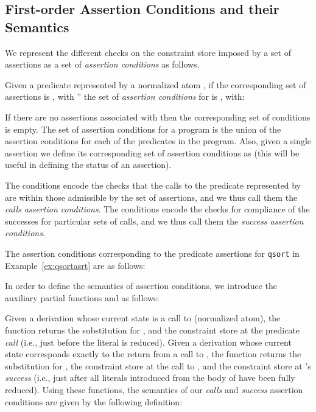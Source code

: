 \documentclass{llncs}
\begin{document}
\subsection{First-order Assertion Conditions and their Semantics}

We represent the different checks on the constraint store imposed by a
set of assertions as a set of \emph{assertion conditions} as follows.

\begin{definition}
  \label{def:assrt-cond}
  Given a predicate represented by a normalized atom , if the
  corresponding set of assertions is , with
  '' the set of \emph{assertion conditions} for
   is , 
  with:
  
\end{definition}

If there are no assertions associated with  then the
corresponding set of conditions is empty.
The set of assertion conditions for a program is the union of the
assertion conditions for each of the predicates in the program.
Also, given a single assertion  we define its corresponding set
of assertion conditions as  (this will be useful in
defining the status of an assertion).

The  conditions encode the checks that the
calls to the predicate represented by  are within those
admissible by the set of assertions, and we thus call them the
\emph{calls assertion conditions}.  The
 conditions encode the checks for
compliance of the successes for particular sets of calls, and we thus
call them the \emph{success assertion conditions}.

\begin{example}
  The assertion conditions corresponding to the predicate assertions
  for \texttt{qsort} in Example~\ref{ex:qsortasrt} are as follows:
  \begin{small}
    
  \end{small}
\end{example}

In order to define the semantics of assertion conditions, we introduce 
the auxiliary partial functions  and 
as follows:


Given a derivation whose current state is a call to  (normalized
atom), the  function returns the substitution
 for , and the constraint store  at the
predicate \emph{call} (i.e., just before the literal is reduced).
Given a derivation whose current state corresponds exactly to the
return from a call to , the  function returns
the substitution  for , the constraint store 
at the call to , and the constraint store  at 's
\emph{success} (i.e., just after all literals introduced from the
body of  have been fully reduced).
Using these functions, the semantics of our \emph{calls} and
\emph{success} assertion conditions are given by the following
definition:
\end{document}
